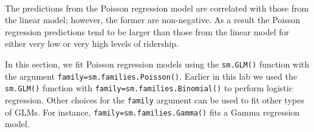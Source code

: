\documentclass[11pt]{article}
\begin{document}
    \begin{center}
    \end{center}
    { \hspace*{\fill} \\}
    
    The predictions from the Poisson regression model are correlated with
those from the linear model; however, the former are non-negative. As a
result the Poisson regression predictions tend to be larger than those
from the linear model for either very low or very high levels of
ridership.

In this section, we fit Poisson regression models using the
\texttt{sm.GLM()} function with the argument
\texttt{family=sm.families.Poisson()}. Earlier in this lab we used the
\texttt{sm.GLM()} function with \texttt{family=sm.families.Binomial()}
to perform logistic regression. Other choices for the \texttt{family}
argument can be used to fit other types of GLMs. For instance,
\texttt{family=sm.families.Gamma()} fits a Gamma regression model.


    
    
    
\end{document}
